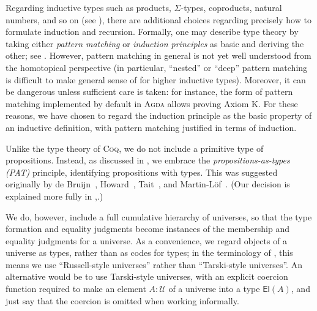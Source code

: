 \documentclass[12pt]{article}
\newcommand{\Agda}{\textsc{Agda}\xspace}
\newcommand{\Coq}{\textsc{Coq}\xspace}
\newcommand{\UU}{\ensuremath{\mathcal{U}}\xspace}
\begin{document}
Regarding inductive types such as products, $\Sigma$-types, coproducts, natural numbers, and so on (see ), there are additional choices regarding precisely how to  formulate induction and recursion.
%
Formally, one may describe type theory by taking either \emph{pattern matching} or \emph{induction principles} as basic and deriving the other; see .
However, pattern matching in general is not yet well understood from the homotopical perspective (in particular, ``nested'' or ``deep'' pattern matching is difficult to make general sense of for higher inductive types).
Moreover, it can be dangerous unless sufficient care is taken: for instance, the form of pattern matching implemented by default in \Agda
{}%
allows proving Axiom K.
%
For these reasons, we have chosen to regard the induction principle as the basic property of an inductive definition, with pattern matching justified in terms of induction.

%
Unlike the type theory of \Coq, we do not include a primitive type of propositions.  Instead, as discussed in , we embrace 
the \emph{propositions-as-types (PAT)} principle, identifying propositions with types.
This was suggested originally by de Bruijn~\cite{deBruijn-1973}, Howard~\cite{howard:pat}, Tait~\cite{Tait-1968}, and Martin-L\"{o}f~\cite{Martin-Lof-1972}.
(Our decision is explained more fully in ,.)

We do, however, include a full cumulative hierarchy of universes, so that the type formation and equality judgments become instances of the membership and equality judgments for a universe.
As a convenience, we regard objects of a universe as types, rather than as codes for types; in the terminology of \cite{martin-lof:bibliopolis}, this means we use ``Russell-style universes'' rather than ``Tarski-style universes''.
%
%
An alternative would be to use Tarski-style universes, with an explicit coercion function required to make an element $A:\UU$ of a universe into a type $\mathsf{El}(A)$, and just say that the coercion is omitted when working informally.
\end{document}
